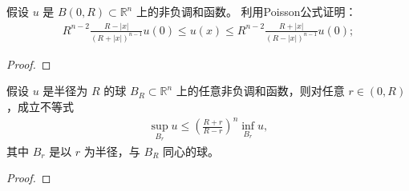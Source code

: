 \documentclass[../../main.tex]{subfiles}%
\begin{document}
\begin{lemma}
假设 $u$ 是 $B(0,R)\subset \mathbb{R}^n$ 上的非负调和函数。
利用Poisson公式证明：
\begin{align*}
R^{n-2}\frac{R-|x|}{(R+|x|)^{n-1}}u(0) \leqslant u(x) \leqslant R^{n-2}\frac{R+|x|}{(R-|x|)^{n-1}}u(0);
\end{align*}
\end{lemma}
\begin{proof}
\end{proof}

\begin{theorem}[Harnack不等式]\label{theorem:Harnack不等式1}
假设 $u$ 是半径为 $R$ 的球 $B_R\subset \mathbb{R}^n$ 上的任意非负调和函数，则对任意 $r\in(0,R)$，成立不等式
\begin{align*}
\sup_{B_r} u \leqslant \left(\frac{R+r}{R-r}\right)^n \inf_{B_r} u,
\end{align*}
其中 $B_r$ 是以 $r$ 为半径，与 $B_R$ 同心的球。
\end{theorem}
\begin{proof}
\end{proof}
\end{document}
